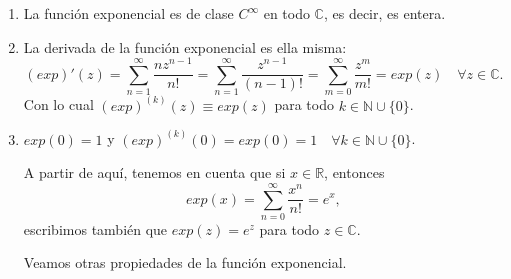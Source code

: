 \begin{enumerate}
    \item La función exponencial es de clase $C^\infty$ en todo \(\mathbb{C}\), es decir, es entera.
    \item La derivada de la función exponencial es ella misma: 
    \[
        (exp)'(z) = \sum_{n=1}^\infty \frac{n z^{n-1}}{n!} = \sum_{n=1}^\infty \frac{z^{n-1}}{(n-1)!} = \sum_{m=0}^\infty \frac{z^m}{m!} = exp(z) \quad \forall z \in \mathbb{C}.
    \]
    Con lo cual $(exp)^{(k)}(z) \equiv exp(z)$ para todo \(k\in\mathbb{N}\cup\{0\}\).	
    \item $exp(0) = 1$ y $(exp)^{(k)}(0) = exp(0) = 1 \quad \forall k \in \mathbb{N}\cup\{0\}$.
    
    A partir de aquí, tenemos en cuenta que si $x \in \mathbb{R}$, entonces 
    \[
        exp(x) = \sum_{n=0}^\infty \frac{x^n}{n!} = e^x,
    \]
    escribimos también que $exp(z) = e^z$ para todo \(z\in\mathbb{C}\).
    
    Veamos otras propiedades de la función exponencial.


\end{enumerate}
